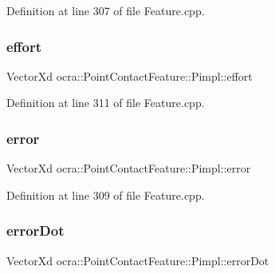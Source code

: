 Definition at line 307 of file Feature.\+cpp.

\hypertarget{structocra_1_1PointContactFeature_1_1Pimpl_ad35d11a459c7be6bae5fe8005c734ffa}{}\label{structocra_1_1PointContactFeature_1_1Pimpl_ad35d11a459c7be6bae5fe8005c734ffa} 
\subsubsection{\texorpdfstring{effort}{effort}}
{\footnotesize\ttfamily Vector\+Xd ocra\+::\+Point\+Contact\+Feature\+::\+Pimpl\+::effort}



Definition at line 311 of file Feature.\+cpp.

\hypertarget{structocra_1_1PointContactFeature_1_1Pimpl_aabf12f72f637db8c9fac8208f513ab48}{}\label{structocra_1_1PointContactFeature_1_1Pimpl_aabf12f72f637db8c9fac8208f513ab48} 
\subsubsection{\texorpdfstring{error}{error}}
{\footnotesize\ttfamily Vector\+Xd ocra\+::\+Point\+Contact\+Feature\+::\+Pimpl\+::error}



Definition at line 309 of file Feature.\+cpp.

\hypertarget{structocra_1_1PointContactFeature_1_1Pimpl_a9dc4c6e3ed1c44c57bf5543197eaca17}{}\label{structocra_1_1PointContactFeature_1_1Pimpl_a9dc4c6e3ed1c44c57bf5543197eaca17} 
\subsubsection{\texorpdfstring{error\+Dot}{errorDot}}
{\footnotesize\ttfamily Vector\+Xd ocra\+::\+Point\+Contact\+Feature\+::\+Pimpl\+::error\+Dot}



